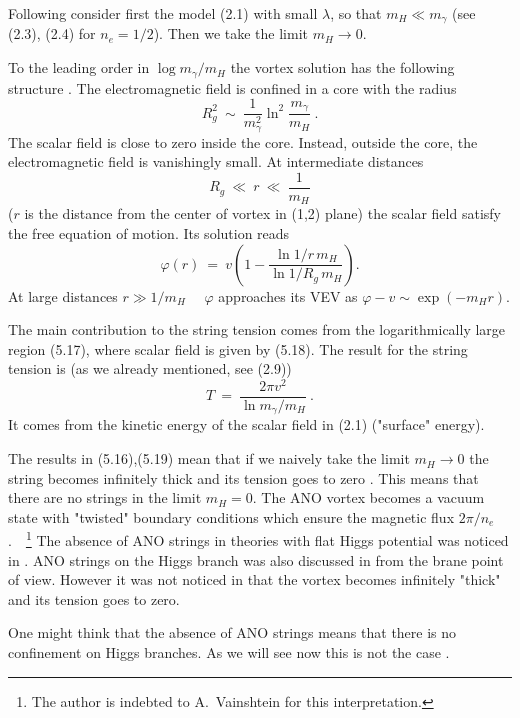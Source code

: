 \documentclass[a4paper,12pt]{article}
\begin{document}
Following \cite{Y} consider first the model (2.1) with small
$\lambda$, so that $m_H\ll m_\gamma$ (see (2.3), (2.4) for
$n_e=1/2$). Then  we take the limit $m_H\to0$.

To the leading order in $\log m_\gamma/m_H$ the vortex
solution has the following structure \cite{Y}. The
electromagnetic field is confined in a core with the radius
\begin{equation}
R^2_g\ \sim\ \frac1{m^2_\gamma}\ln^2\frac{m_\gamma}{m_H}\ .
\end{equation}
The scalar field is close to zero inside the core. Instead,
outside the core, the electromagnetic field is vanishingly
small. At intermediate distances
\begin{equation}
R_g\ \ll\ r\ \ll\ \frac1{m_H}
\end{equation}
($r$ is the distance from the center of vortex in (1,2) plane)
the scalar field satisfy the free equation of motion. Its
solution reads \cite{Y}
\begin{equation}
\varphi(r)\ =\ v\left(1-\frac{\ln1/r\,m_H}{\ln
1/R_g\,m_H}\right) .
\end{equation}
At large distances $r\gg1/m_H$~~ $\varphi$ approaches its
VEV as $\varphi-v \sim\exp(-m_Hr)$.

The main contribution to the string tension comes from the
logarithmically large region (5.17), where scalar field is given
by (5.18). The result for the string tension is \cite{Y} (as we
already mentioned, see (2.9))
\begin{equation}
T\ =\ \frac{2\pi v^2}{\ln m_\gamma/m_H}\ .
\end{equation}
It comes from the kinetic energy of the scalar field in (2.1)
("surface" energy).

The results in (5.16),(5.19) mean that if we naively take the
limit $m_H\to0$ the string becomes infinitely thick and its
tension goes to zero \cite{Y}. This means that there are no
strings in the limit $m_H=0$. The ANO vortex becomes a vacuum
state with "twisted" boundary conditions which ensure the
magnetic flux $2\pi/n_e$.~~\footnote{The author is indebted to
A.~Vainshtein for this interpretation.} The absence of ANO
strings in theories with flat Higgs potential was noticed in
\cite{R,ARH}. ANO strings on the Higgs branch was also discussed
in \cite{GMV} from the brane point of view. However it was not
noticed in \cite{GMV} that the vortex becomes infinitely "thick"
and its tension goes to zero.

One might think that the 
 absence of ANO strings means that there is no
  confinement on Higgs branches. As
we will see now this is not  the case \cite{Y}.
\end{document}
